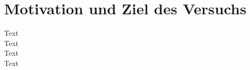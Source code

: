 

\chapter{Motivation und Ziel des Versuchs}
\label{chap:einleitung}

Text \\ [8cm]
Text \\ [8cm]
Text \\ [8cm]
Text \\ [8cm]